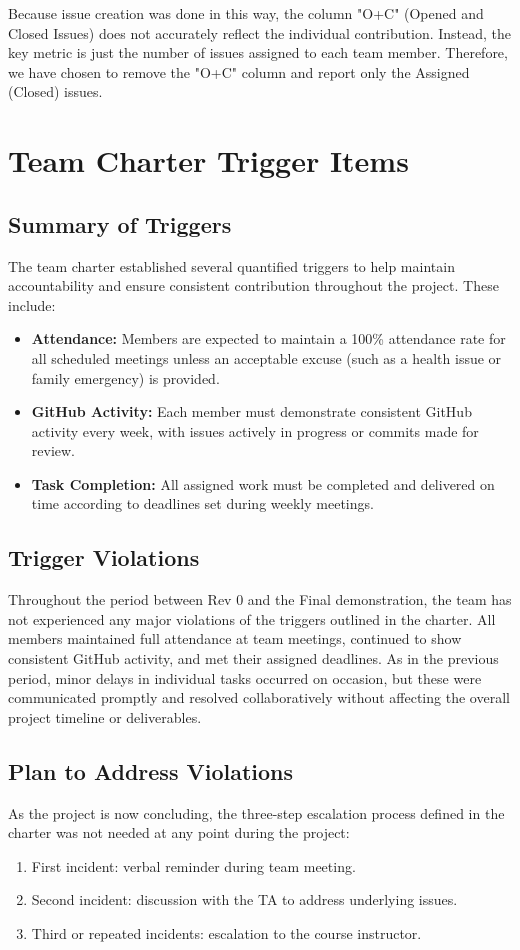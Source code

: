 \documentclass{article}
\begin{document}
\noindent
Because issue creation was done in this way, the column "O+C" (Opened and Closed Issues) does not accurately reflect the individual contribution. Instead, the key metric is just the number of issues assigned to each team member. Therefore, we have chosen to remove the "O+C" column and report only the Assigned (Closed) issues.

\section{Team Charter Trigger Items}

\subsection{Summary of Triggers}
The team charter established several quantified triggers to help maintain accountability and ensure consistent contribution throughout the project. These include:
\begin{itemize}
    \item \textbf{Attendance:} Members are expected to maintain a 100\% attendance rate for all scheduled meetings unless an acceptable excuse (such as a health issue or family emergency) is provided.
    \item \textbf{GitHub Activity:} Each member must demonstrate consistent GitHub activity every week, with issues actively in progress or commits made for review.
    \item \textbf{Task Completion:} All assigned work must be completed and delivered on time according to deadlines set during weekly meetings.
\end{itemize}

\subsection{Trigger Violations}
Throughout the period between Rev 0 and the Final demonstration, the team has not experienced any major violations of the triggers outlined in the charter. All members maintained full attendance at team meetings, continued to show consistent GitHub activity, and met their assigned deadlines. As in the previous period, minor delays in individual tasks occurred on occasion, but these were communicated promptly and resolved collaboratively without affecting the overall project timeline or deliverables.

\subsection{Plan to Address Violations}
As the project is now concluding, the three-step escalation process defined in the charter was not needed at any point during the project:
\begin{enumerate}
    \item First incident: verbal reminder during team meeting.
    \item Second incident: discussion with the TA to address underlying issues.
    \item Third or repeated incidents: escalation to the course instructor.
\end{enumerate}
\end{document}
